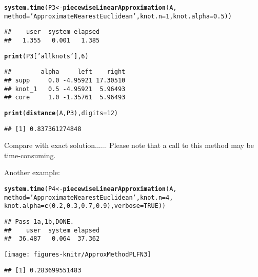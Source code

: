 \documentclass[11pt]{article}\usepackage{graphicx, color}
\makeatletter
\newcommand{\hlfunctioncall}[1]{\textcolor[rgb]{0.501960784313725,0,0.329411764705882}{\textbf{#1}}}%
\newcommand{\hlstring}[1]{\textcolor[rgb]{0.6,0.6,1}{#1}}%
\newenvironment{kframe}{%
 \def\at@end@of@kframe{}%
 \ifinner\ifhmode%
  \def\at@end@of@kframe{\end{minipage}}%
  \begin{minipage}{\columnwidth}%
 \fi\fi%
 \def\FrameCommand##1{\hskip\@totalleftmargin \hskip-\fboxsep
 \colorbox{shadecolor}{##1}\hskip-\fboxsep
     \hskip-\linewidth \hskip-\@totalleftmargin \hskip\columnwidth}%
 \MakeFramed {\advance\hsize-\width
   \@totalleftmargin\z@ \linewidth\hsize
   \@setminipage}}%
 {\par\unskip\endMakeFramed%
 \at@end@of@kframe}
\newenvironment{knitrout}{}{} %
\makeatother
\begin{document}
\begin{knitrout}\small
{}\color{fgcolor}\begin{kframe}
\begin{alltt}
\hlfunctioncall{system.time}(P3 <- \hlfunctioncall{piecewiseLinearApproximation}(A,
   method=\hlstring{'ApproximateNearestEuclidean'}, knot.n=1, knot.alpha=0.5))
\end{alltt}
\begin{verbatim}
##    user  system elapsed 
##   1.355   0.001   1.385
\end{verbatim}
\begin{alltt}
\hlfunctioncall{print}(P3[\hlstring{'allknots'}], 6)
\end{alltt}
\begin{verbatim}
##        alpha     left    right
## supp     0.0 -4.95921 17.30510
## knot_1   0.5 -4.95921  5.96493
## core     1.0 -1.35761  5.96493
\end{verbatim}
\begin{alltt}
\hlfunctioncall{print}(\hlfunctioncall{distance}(A, P3), digits=12)
\end{alltt}
\begin{verbatim}
## [1] 0.837361274848
\end{verbatim}
\end{kframe}
\end{knitrout}

\noindent
Compare with exact solution......
Please note that a call to this method may be time-consuming.

Another example:

\begin{knitrout}\small
{}\color{fgcolor}\begin{kframe}
\begin{alltt}
\hlfunctioncall{system.time}(P4 <- \hlfunctioncall{piecewiseLinearApproximation}(A,
   method=\hlstring{'ApproximateNearestEuclidean'}, knot.n=4,
   knot.alpha=\hlfunctioncall{c}(0.2, 0.3, 0.7, 0.9), verbose=TRUE))
\end{alltt}
\begin{verbatim}
## Pass 1a,1b,DONE.
##    user  system elapsed 
##  36.487   0.064  37.362
\end{verbatim}
\end{kframe}
\end{knitrout}


\begin{center}
\begin{knitrout}\small
{}\color{fgcolor}

{\centering \texttt{[image: figures-knitr/ApproxMethodPLFN3]} 

}


\begin{kframe}\begin{verbatim}
## [1] 0.283699551483
\end{verbatim}
\end{kframe}
\end{knitrout}

\end{center}
\end{document}

